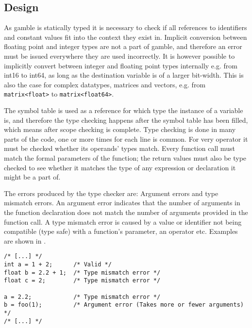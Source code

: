 \subsection*{Design}
As \gls{gamble} is statically typed it is necessary to check if all references to identifiers and constant values fit into the context they exist in. 
Implicit conversion between floating point and integer types are not a part of \gls{gamble}, and therefore an error must be issued everywhere they are used incorrectly. 
It is however possible to implicitly convert between integer and floating point types internally e.g. from int16 to int64, as long as the destination variable is of a larger bit-width. 
This is also the case for complex datatypes, matrices and vectors, e.g. from \texttt{matrix<float>} to \texttt{matrix<float64>}. 

The symbol table is used as a reference for which type the instance of a variable is, and therefore the type checking happens after the symbol table has been filled, which means after scope checking is complete. 
Type checking is done in many parts of the code, one or more times for each line is common. 
For very operator it must be checked whether its operands' types match. 
Every function call must match the formal parameters of the function; the return values must also be type checked to see whether it matches the type of any expression or declaration it might be a part of.

The errors produced by the type checker are: Argument errors and type mismatch errors.
An argument error indicates that the number of arguments in the function declaration does not match the number of arguments provided in the function call.
A type mismatch error is caused by a value or identifier not being compatible (type safe) with a function's parameter, an operator etc. 
Examples are shown in .

\begin{lstlisting}[caption=Examples of type errors in \gls{gamble},numbers=none,frame=tlrb,label={lst:typeErrors}]
/* [...] */
int a = 1 + 2;      /* Valid */
float b = 2.2 + 1;  /* Type mismatch error */
float c = 2;        /* Type mismatch error */

a = 2.2;            /* Type mismatch error */
b = foo(1);         /* Argument error (Takes more or fewer arguments) */ 
/* [...] */
\end{lstlisting}

